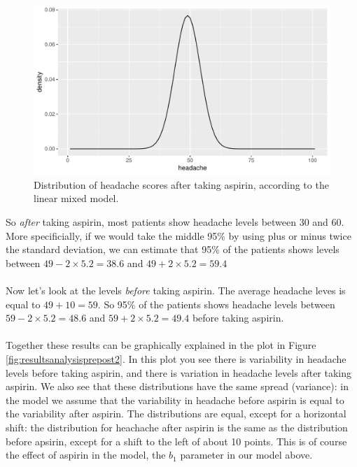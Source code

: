 \documentclass[]{report}\usepackage[]{graphicx}\usepackage[]{color}
\makeatletter
\def\maxwidth{ %
  \ifdim\Gin@nat@width>\linewidth
    \linewidth
  \else
    \Gin@nat@width
  \fi
}
\newenvironment{knitrout}{}{} %
\makeatother
\begin{document}
\begin{knitrout}
\color{fgcolor}\begin{figure}

{\centering \includegraphics[width=\maxwidth]{figure/resultsprepost1-1} 

}

\caption[Distribution of headache scores after taking aspirin, according to the linear mixed model]{Distribution of headache scores after taking aspirin, according to the linear mixed model.}\label{fig:resultsprepost1}
\end{figure}


\end{knitrout}

So \textit{after} taking aspirin, most patients show headache levels between 30 and 60. More specificially, if we would take the middle 95\% by using plus or minus twice the standard deviation, we can estimate that 95\% of the patients shows levels between $49 - 2 \times 5.2 = 38.6$ and $49 + 2 \times 5.2 = 59.4$
\\
\\
Now let's look at the levels \textit{before} taking aspirin. The average headache leves is equal to $49 + 10 = 59$. So 95\% of the patients shows headache levels between $59 - 2 \times 5.2 = 48.6$ and $59 + 2 \times 5.2 = 49.4$ before taking aspirin. 
\\
\\
Together these results can be graphically explained in the plot in Figure \ref{fig:resultsanalysisprepost2}. In this plot you see there is variability in headache levels before taking aspirin, and there is variation in headache levels after taking aspirin. We also see that these distributions have the same spread (variance): in the model we assume that the variability in headache before aspirin is equal to the variability after aspirin. The distributions are equal, except for a horizontal shift: the distribution for heachache after aspirin is the same as the distribution before apsirin, except for a shift to the left of about 10 points. This is of course the effect of aspirin in the model, the $b_1$ parameter in our model above.  
\end{document}
